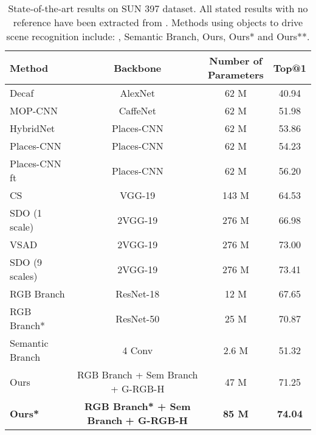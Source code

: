 \documentclass[review, 3p, sort&compress]{elsarticle}
\begin{document}
\begin{table}[t!]
    \begin{centering}
    \renewcommand{\arraystretch}{1.2}
    \footnotesize
    \begin{tabular}{lccc}
        \hline 
        Method & Backbone & \makecell{Number of \\ Parameters} & Top@1\tabularnewline 
        \hline 
        Decaf & AlexNet &  62 M & 40.94\tabularnewline
        MOP-CNN  & CaffeNet &  62 M & 51.98\tabularnewline
        HybridNet & Places-CNN &  62 M & 53.86\tabularnewline
        Places-CNN & Places-CNN &  62 M & 54.23\tabularnewline
        Places-CNN ft & Places-CNN &  62 M & 56.20\tabularnewline
        CS & VGG-19 &  143 M & 64.53\tabularnewline
        SDO (1 scale) \cite{cheng2018scene} & 2VGG-19 &  276 M & 66.98\tabularnewline
        VSAD \cite{wang2017weakly} & 2VGG-19 &  276 M & 73.00\tabularnewline
        SDO (9 scales) \cite{cheng2018scene} & 2VGG-19 &  276 M & 73.41\tabularnewline
        \hline
        RGB Branch & ResNet-18 &  12 M & 67.65\tabularnewline
        RGB Branch* & ResNet-50 &  25 M & 70.87\tabularnewline
        Semantic Branch & 4 Conv &  2.6 M & 51.32\tabularnewline
        Ours &  RGB Branch + Sem Branch + G-RGB-H &  47 M & 71.25\tabularnewline
        \textbf{Ours*} & \textbf{RGB Branch* + Sem Branch} \textbf{+ G-RGB-H} & \textbf{ 85 M} & \textbf{74.04}\tabularnewline
        \hline 
    \end{tabular}
    \caption{State-of-the-art results on SUN 397 dataset. All stated results with no reference have been extracted from \cite{cheng2018scene}. Methods using objects to drive scene recognition include: \cite{cheng2018scene, wang2017weakly}, Semantic Branch, Ours, Ours* and Ours**.}
    \label{tab:SUN 397 Results}
    \par\end{centering}
\end{table}
\end{document}
